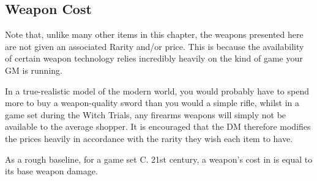 \subsection{Weapon Cost}

Note that, unlike many other items in this chapter, the weapons presented here are not given an associated Rarity and/or price. This is because the availability of certain weapon technology relies incredibly heavily on the kind of game your GM is running. 

In a true-realistic model of the modern world, you would probably have to spend more to buy a weapon-quality sword than you would a simple rifle, whilst in a game set during the Witch Trials, any firearms weapons will simply not be available to the average shopper. It is encouraged that the DM therefore modifies the prices heavily in accordance with the rarity they wish each item to have. 

As a rough baseline, for a game set C. 21st century, a weapon's cost in  is equal to its base weapon damage. 

